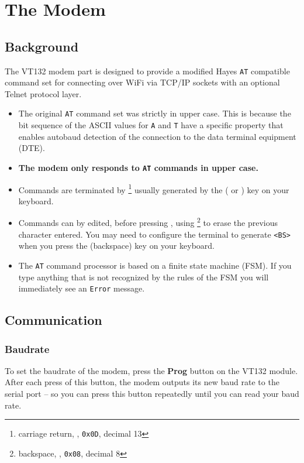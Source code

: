 \chapter{The Modem}

\section{Background}

The VT132 modem part is designed to provide a modified Hayes \texttt{AT} compatible command set for connecting over WiFi via TCP/IP
sockets with an optional Telnet protocol layer.

\begin{itemize}[leftmargin=1em]
	\item The original \texttt{AT} command set was strictly in upper case. This is because the bit sequence of the ASCII values for \texttt{A} and \texttt{T} have
		a specific property that enables autobaud detection of the connection to the data terminal equipment (DTE).
	\item \textbf{The modem only responds to \texttt{AT} commands in upper case.}
	\item Commands are terminated by \LKeyEnter \footnote{carriage return, , \texttt{0x0D}, decimal 13} usually generated by the \LKeyEnter{}
		( or ) key on your keyboard.
	\item Commands can by edited, before pressing \LKeyEnter, using \LKeyBack \footnote{backspace, , \texttt{0x08}, decimal 8} to erase the previous
		character entered. You may need to configure the terminal to generate \texttt{<BS>} when you press the \LKeyBack{} (backspace) key on your keyboard.
	\item The \texttt{AT} command processor is based on a finite state machine (FSM). If you type anything that is not recognized by the rules of the 
		FSM you will immediately see an \texttt{Error} message.
\end{itemize}

\section{Communication}

\subsection{Baudrate}

To set the baudrate of the modem, press the \textbf{Prog} button on the VT132 module. After each press of this button, the modem outputs its new
baud rate to the serial port -- so you can press this button repeatedly until you can read your baud rate.

